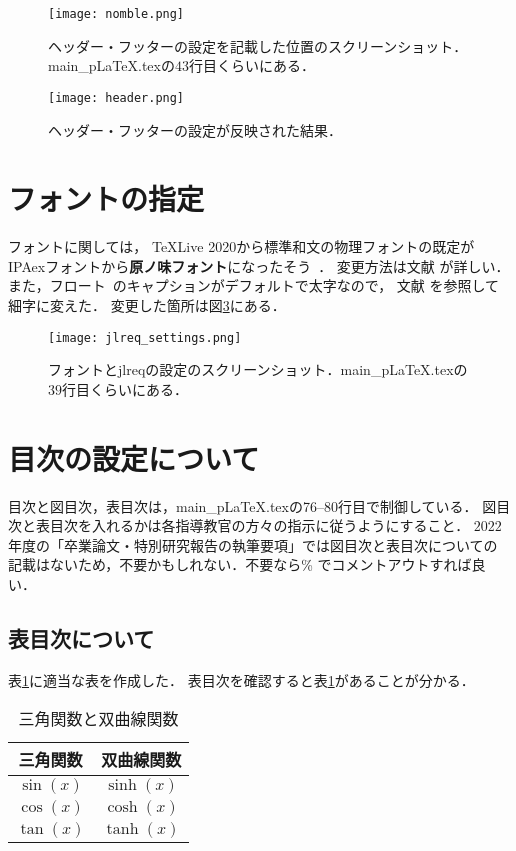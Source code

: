 \begin{figure}[h]
  \centering
  \texttt{[image: nomble.png]}
  \caption{ヘッダー・フッターの設定を記載した位置のスクリーンショット．main\_pLaTeX.texの$43$行目くらいにある．}
  \label{fig:nomble}
\end{figure}
\begin{figure}[h]
  \centering
  \texttt{[image: header.png]}
  \caption{ヘッダー・フッターの設定が反映された結果．}
  \label{fig:header}
\end{figure}


\section{フォントの指定}
フォントに関しては，
\TeX Live 2020から標準和文の物理フォントの既定が
IPAexフォントから\textbf{\textsf{原ノ味フォント}}になったそう~\cite{font}．
変更方法は文献 \cite{font} が詳しい．
また，フロート~\cite{float}のキャプションがデフォルトで太字なので，
文献 \cite{jlreq} を参照して細字に変えた．
変更した箇所は図\ref{fig:jlreqset}にある．

\begin{figure}[h]
  \centering
  \texttt{[image: jlreq\_settings.png]}
  \caption{フォントとjlreqの設定のスクリーンショット．main\_pLaTeX.texの$39$行目くらいにある．}
  \label{fig:jlreqset}
\end{figure}


\section{目次の設定について}
目次と図目次，表目次は，main\_pLaTeX.texの76--80行目で制御している．
図目次と表目次を入れるかは各指導教官の方々の指示に従うようにすること．
$2022$年度の「卒業論文・特別研究報告の執筆要項」では図目次と表目次についての
記載はないため，不要かもしれない．不要なら\% でコメントアウトすれば良い．

\subsection{表目次について}
表\ref{tab:triangle}に適当な表を作成した．
表目次を確認すると表\ref{tab:triangle}があることが分かる．

\begin{table}[htbp]
  \centering
  \caption{三角関数と双曲線関数}
  \begin{tabular}{cc} \hline 
    三角関数 & 双曲線関数 \\ \hline
    $\sin(x)$ & $\sinh(x)$ \\
    $\cos(x)$ & $\cosh(x)$ \\
    $\tan(x)$ & $\tanh(x)$ \\ \hline
  \end{tabular}
  \label{tab:triangle}
\end{table}


